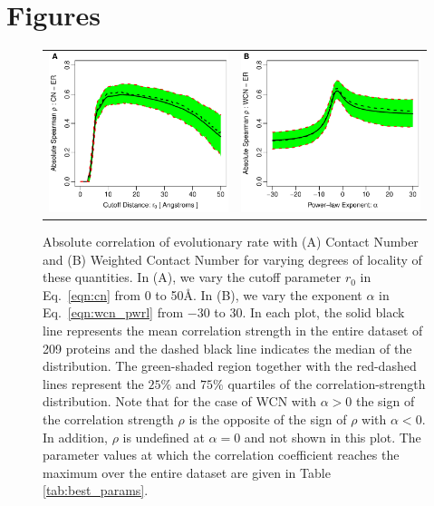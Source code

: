 \documentclass[12pt]{article}
\begin{document}

\cleardoublepage
\section*{Figures}
    \begin{figure}[h]
        \begin{center}
        \begin{tabular}{cc}
            \includegraphics[width=3.1in]{spcor_cnSC_r4sJC.pdf} & \includegraphics[width=3.1in]{spcor_cnwSC_r4sJC.pdf}
        \end{tabular}
        \end{center}
        \caption{Absolute correlation of evolutionary rate with (A) Contact Number and (B) Weighted Contact Number for varying degrees of locality of these quantities. In (A), we vary the cutoff parameter $r_0$ in Eq.~\ref{eqn:cn} from 0 to 50\AA. In (B), we vary the exponent $\alpha$ in Eq.~\ref{eqn:wcn_pwrl} from $-30$ to 30. In each plot, the solid black line represents the mean correlation strength in the entire dataset of 209 proteins and the dashed black line indicates the median of the distribution. The green-shaded region together with the red-dashed lines represent the $25\%$ and $75\%$ quartiles of the correlation-strength distribution. Note that for the case of WCN with $\alpha>0$ the sign of the correlation strength $\rho$ is the opposite of the sign of $\rho$ with $\alpha<0$. In addition, $\rho$ is undefined at $\alpha=0$ and not shown in this plot. The parameter values at which the correlation coefficient reaches the maximum over the entire dataset are given in Table \ref{tab:best_params}.}
        \label{fig:cnwcnp}
    \end{figure}
\end{document}
